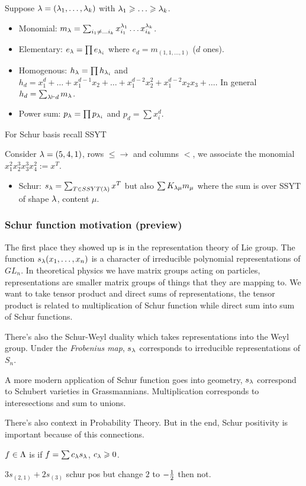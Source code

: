 \documentclass[12pt]{memoir}
\begin{document}
Suppose $\lambda=(\lambda_1,\dots,\lambda_k)$ with $\la_1\geq\dots\geq\la_k$. 
\begin{itemize}
    \item Monomial: $m_\lambda=\sum_{i_1\neq\dots i_k}x_{i_1}^{\lambda_1}\dots x_{i_k}^{\lambda_k}$.
    \item Elementary: $e_\lambda=\prod e_{\lambda_i}$ where $e_d=m_{(1,1,\dots,1)}$ ($d$ ones).
    \item Homogenous: $h_\lambda=\prod h_{\lambda_i}$ and $h_d=x_1^d+\dots+x_1^{d-1}x_2+\dots+x_1^{d-2}x_2^2+x_1^{d-2}x_2x_3+\dots$. In general $h_d=\sum_{\lambda\vdash d}m_\lambda$.
    \item Power sum: $p_\lambda=\prod p_{\lambda_i}$ and $p_d=\sum x_i^d$.
\end{itemize}

For Schur basis recall SSYT 

\begin{Ex}
    Consider $\lambda=(5,4,1)$, rows $\leq\to$ and columns $<$, we associate the monomial $x_1^2x_2^3x_3^3x_4^2:=x^T$.
\end{Ex}

\begin{itemize}
    \itemsep=-0.4em
    \item Schur: $s_\lambda=\sum_{T\in SSYT(\lambda)}x^T$ but also $\sum K_{\lambda\mu}m_\mu$ where the sum is over SSYT of shape $\lambda$, content $\mu$.
\end{itemize}

\subsubsection{Schur function motivation (preview)}

The first place they showed up is in the representation theory of Lie group.  The function $s_\lambda(x_1,\dots,x_n)$ is a character of irreducible polynomial representations of $GL_n$. In theoretical physics we have matrix groups acting on particles, representations are smaller matrix groups of things that they are mapping to. We want to take tensor product and direct sums of representations, the tensor product is related to multiplication of Schur function while direct sum into sum of Schur functions.\par 
There's also the Schur-Weyl duality which takes representations into the Weyl group. Under the \emph{Frobenius map}, $s_\lambda$ corresponds to irreducible representations of $S_n$.\par 
A more modern application of Schur function goes into geometry, $s_\lambda$ correspond to Schubert varieties in Grassmannians. Multiplication corresponds to interesections and sum to unions.\par 
There's also context in Probability Theory. But in the end, Schur positivity is important because of this connections. 

\begin{Def}
    $f\in\Lambda$ is  if $f=\sum c_\lambda s_\lambda$, $c_\lambda\geqslant 0$.
\end{Def}

\begin{Ex}
    $3s_{(2,1)}+2s_{(3)}$ schur pos but change $2$ to $-\half$ then not.
\end{Ex}
\end{document}
